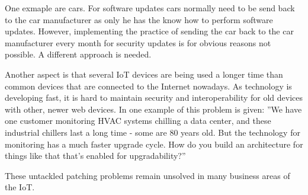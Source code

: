 \documentclass[conference]{IEEEtran}
\begin{document}
One exmaple are cars. For software updates cars normally need to be send back 
to the car manufacturer as only he has the know how to perform software 
updates. However, implementing the practice of sending the car back to the car 
manufacturer every month for security updates is for obvious reasons not 
possible. A different approach is needed.

Another aspect is that several IoT devices are being used a longer time than 
common devices that are connected to the Internet nowadays. As technology is 
developing fast, it is hard to maintain security and interoperability for old 
devices with other, newer web devices. In \cite{arstechnicaPage} one example of 
this problem is given: ''We have one customer monitoring HVAC systems chilling 
a data center, and these industrial chillers last a long time - some are 80 
years old. But the technology for monitoring has a much faster upgrade cycle. 
How do you build an architecture for things like that that's enabled for  
upgradability?'' 

These untackled patching problems remain unsolved in many business areas of the 
IoT. 



%
%

\end{document}
